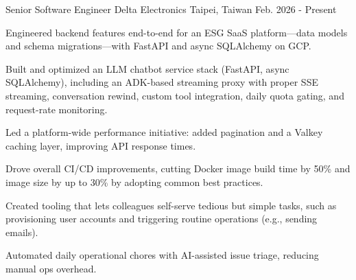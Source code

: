 

\begin{cventries}

  \cventry
    {Senior Software Engineer} %
    {Delta Electronics} %
    {Taipei, Taiwan} %
    {Feb. 2026 - Present} %
    {
      \begin{cvitems} %
        \item {Engineered backend features end-to-end for an ESG SaaS platform—data models and schema migrations—with FastAPI and async SQLAlchemy on GCP.}
        \item {Built and optimized an LLM chatbot service stack (FastAPI, async SQLAlchemy), including an ADK-based streaming proxy with proper SSE streaming, conversation rewind, custom tool integration, daily quota gating, and request-rate monitoring.}
        \item {Led a platform-wide performance initiative: added pagination and a Valkey caching layer, improving API response times.}
        \item {Drove overall CI/CD improvements, cutting Docker image build time by 50\% and image size by up to 30\% by adopting common best practices.}
        \item {Created tooling that lets colleagues self-serve tedious but simple tasks, such as provisioning user accounts and triggering routine operations (e.g., sending emails).}
        \item {Automated daily operational chores with AI-assisted issue triage, reducing manual ops overhead.}
      \end{cvitems}
    }


\end{cventries}
